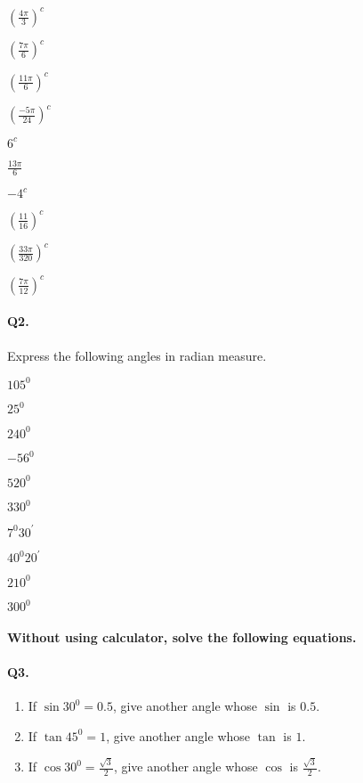\documentclass{article}
\begin{document}
\begin{enumerate*}[label=\alph*.]
  \item $\left(\frac{4\pi}{3}\right)^{c}$
  \item $\left(\frac{7\pi}{6}\right)^{c}$
  \item $\left(\frac{11\pi}{6}\right)^{c}$
  \item $\left(\frac{-5\pi}{24}\right)^{c}$
  \item $6^{c}$
  \item $\frac{13\pi}{6}$
  \item $-4^{c}$
  \item $\left(\frac{11}{16}\right)^{c}$
  \item $\left(\frac{33\pi}{320}\right)^{c}$
  \item $\left(\frac{7\pi}{12}\right)^{c}$
\end{enumerate*}

\paragraph{Q2.}
Express the following angles in radian measure.

\begin{enumerate*}[label=\alph*)]
  \item $105^{0}$
  \item $25^{0}$
  \item $240^{0}$
  \item $-56^{0}$
  \item $520^{0}$
  \item $330^{0}$
  \item $7^{0}30^{'}$
  \item $40^{0}20^{'}$
  \item $210^{0}$
  \item $300^{0}$
\end{enumerate*}

\paragraph{Without using calculator, solve the following equations.}
\paragraph{Q3.}
\begin{enumerate}[label=\alph*)]
  \item If $\sin30^{0} = 0.5$, give another angle whose $\sin$ is $0.5$.
  \item If $\tan45^{0} = 1$, give another angle whose $\tan$ is $1$.
  \item If $\cos30^{0} = \frac{\sqrt{3}}{2}$, give another angle whose $\cos$ is $\frac{\sqrt{3}}{2}$.
\end{enumerate}
\end{document}
